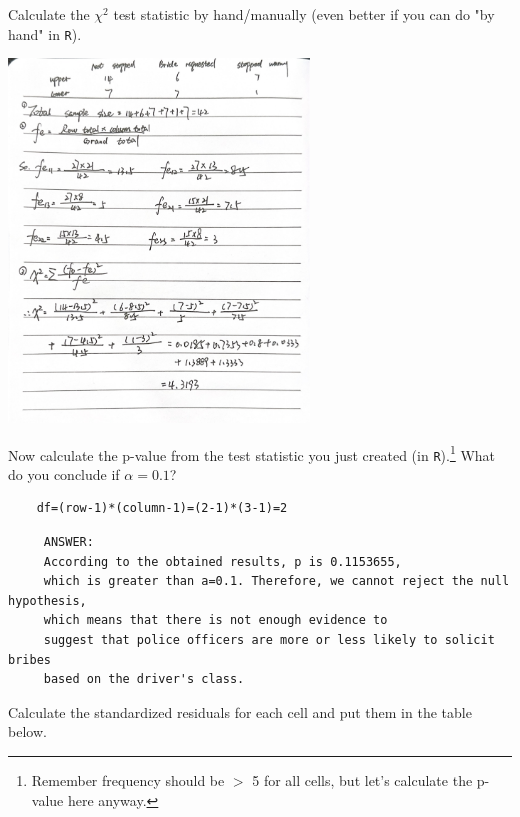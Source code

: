 \documentclass[12pt,letterpaper]{article}
\begin{document}
\begin{enumerate} 
	\item [(a)]
	Calculate the $\chi^2$ test statistic by hand/manually (even better if you can do "by hand" in \texttt{R}).\\ 
	 \begin{center}
	 	\item[]
	 	\includegraphics[width=0.6\textwidth]{question1.a.RJ.C.jpg} 
	 \end{center}
	\vspace{7cm}
	
	\item [(b)]
	Now calculate the p-value from the test statistic you just created (in \texttt{R}).\footnote{Remember frequency should be $>$ 5 for all cells, but let's calculate the p-value here anyway.}  What do you conclude if $\alpha = 0.1$?\\

\begin{verbatim}
	df=(row-1)*(column-1)=(2-1)*(3-1)=2
\end{verbatim}
\begin{verbatim}
	 ANSWER:
	 According to the obtained results, p is 0.1153655,
	 which is greater than a=0.1. Therefore, we cannot reject the null hypothesis, 
	 which means that there is not enough evidence to 
	 suggest that police officers are more or less likely to solicit bribes 
	 based on the driver's class.
\end{verbatim}
	
	\newpage
	\item [(c)] Calculate the standardized residuals for each cell and put them in the table below.
	\vspace{1cm}


\end{enumerate}
\end{document}
